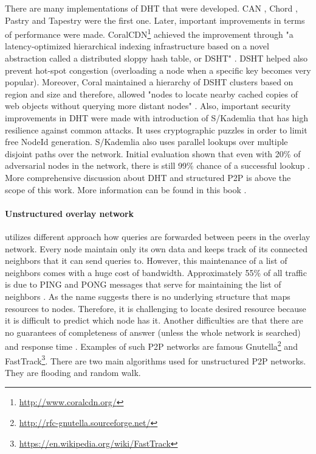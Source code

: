 There are many implementations of DHT that were developed. CAN \cite{ratnasamy_scalable_2001}, Chord \cite{stoica_chord:_2003}, Pastry \cite{rowstron_pastry:_2001} and Tapestry \cite{zhao_tapestry:_2004} were the first one. Later, important improvements in terms of performance were made. CoralCDN\footnote{\url{http://www.coralcdn.org/}} achieved the improvement through "a latency-optimized hierarchical indexing infrastructure based on a novel abstraction called a distributed sloppy hash table, or DSHT" \cite{freedman_democratizing_2004}. DSHT helped also prevent hot-spot congestion (overloading a node when a specific key becomes very popular). Moreover, Coral maintained a hierarchy of DSHT clusters based on region and size and therefore, allowed "nodes to locate nearby cached copies of web objects without querying more distant nodes" \cite{freedman_democratizing_2004}. Also, important security improvements in DHT were made with introduction of S/Kademlia \cite{baumgart_s/kademlia:_2007} that has high resilience against common attacks. It uses cryptographic puzzles in order to limit free NodeId generation. S/Kademlia also uses parallel lookups over multiple disjoint paths over the network. Initial evaluation shown that even with 20\% of adversarial nodes in the network, there is still 99\% chance of a successful lookup \cite{baumgart_s/kademlia:_2007}. More comprehensive discussion about DHT and structured P2P is above the scope of this work. More information can be found in this book \cite{korzun_structured_2013}.



\paragraph{Unstructured overlay network} utilizes different approach how queries are forwarded between peers in the overlay network. Every node maintain only its own data and keeps track of its connected neighbors that it can send queries to. However, this maintenance of a list of neighbors comes with a huge cost of bandwidth. Approximately 55\% of all traffic is due to PING and PONG messages that serve for maintaining the list of neighbors \cite{ripeanu_mapping_2002}. As the name suggests there is no underlying structure that maps resources to nodes. Therefore, it is challenging to locate desired resource because it is difficult to predict which node has it. Another difficulties are that there are no guarantees of completeness of answer (unless the whole network is searched) and response time \cite{vu_peer--peer_2010}. Examples of such P2P networks are famous Gnutella\footnote{\url{http://rfc-gnutella.sourceforge.net/}} and FastTrack\footnote{\url{https://en.wikipedia.org/wiki/FastTrack}}. There are two main algorithms used for unstructured P2P networks. They are flooding and random walk.

